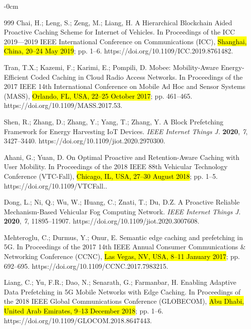 \documentclass[electronics,aricle,accept,pdftex,moreauthors]{Definitions/mdpi}
\begin{document}
\begin{adjustwidth}{-\extralength}{0cm}
\begin{thebibliography}{999}
Chai, H.; Leng, S.; Zeng, M.; Liang, H. A Hierarchical Blockchain Aided Proactive Caching Scheme for Internet of Vehicles. In Proceedings of the ICC 2019---2019 IEEE International Conference on Communications (ICC), \hl{Shanghai, China, 20--24 May 2019}; pp. 1--6. https://doi.org/10.1109/ICC.2019.8761482.

Tran, T.X.; Kazemi, F.; Karimi, E.; Pompili, D. Mobee: Mobility-Aware Energy-Efficient Coded Caching in Cloud Radio Access Networks. In Proceedings of the 2017 IEEE 14th International Conference on Mobile Ad Hoc and Sensor Systems (MASS), \hl{Orlando, FL, USA, 22--25 October 2017}; pp. 461--465. https://doi.org/10.1109/MASS.2017.53.

Shen, R.; Zhang, D.; Zhang, Y.; Yang, T.; Zhang, Y. A Block Prefetching Framework for Energy Harvesting IoT Devices. \emph{IEEE Internet Things J.} \textbf{2020}, \emph{7}, 3427--3440. https://doi.org/10.1109/jiot.2020.2970300.

Ahani, G.; Yuan, D. On Optimal Proactive and Retention-Aware Caching with User Mobility. In Proceedings of the 2018 IEEE 88th Vehicular Technology Conference (VTC-Fall), \hl{Chicago, IL, USA, 27--30 August 2018}; pp. 1--5. https://doi.org/10.1109/VTCFall..

Dong, L.; Ni, Q.; Wu, W.; Huang, C.; Znati, T.; Du, D.Z.  A Proactive Reliable Mechanism-Based Vehicular Fog Computing Network. \emph{IEEE Internet Things J.} \textbf{2020}, \emph{7}, 11895--11907. https://doi.org/10.1109/jiot.2020.3007608.

Mehteroglu, C.; Durmus, Y.; Onur, E. Semantic edge caching and prefetching in 5G. In Proceedings of the 2017 14th IEEE Annual Consumer Communications \& Networking Conference (CCNC), \hl{Las Vegas, NV, USA, 8--11 January 2017}; pp. 692--695. https://doi.org/10.1109/CCNC.2017.7983215.

Liang, C.; Yu, F.R.; Dao, N.; Senarath, G.; Farmanbar, H. Enabling Adaptive Data Prefetching in 5G Mobile Networks with Edge Caching. In Proceedings of the 2018 IEEE Global Communications Conference (GLOBECOM),  \hl{Abu Dhabi, United Arab Emirates, 9--13 December 2018}; pp. 1--6. https://doi.org/10.1109/GLOCOM.2018.8647443.

\end{thebibliography}
\end{adjustwidth}
\end{document}

